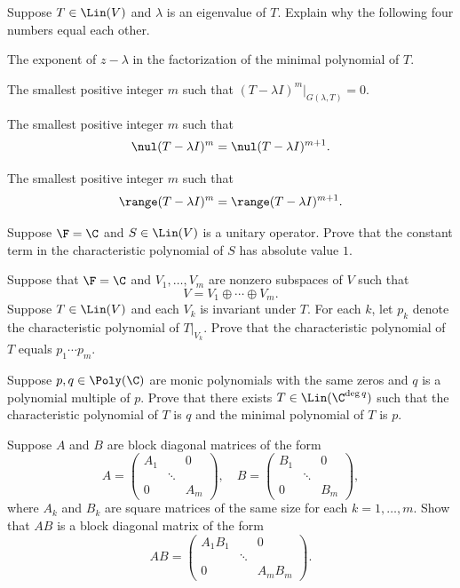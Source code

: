 \begin{exc}
\begin{exercise}
Suppose $T\in\Lin(V)$ and $\lambda$ is an eigenvalue of $T$. Explain why the
following four numbers equal each other.
\begin{parts}
\item The exponent of $z-\lambda$ in the factorization of the minimal
  polynomial of $T$.
\item The smallest positive integer $m$ such that
  $(T-\lambda I)^m|_{G(\lambda,T)}=0$.
\item The smallest positive integer $m$ such that
  \[ \nul(T-\lambda I)^m = \nul(T-\lambda I)^{m+1}. \]
\item The smallest positive integer $m$ such that
  \[ \range(T-\lambda I)^m = \range(T-\lambda I)^{m+1}. \]
\end{parts}
\end{exercise}

\begin{exercise}
Suppose $\F=\C$ and $S\in\Lin(V)$ is a unitary operator. Prove that the
constant term in the characteristic polynomial of $S$ has absolute value $1$.
\end{exercise}

\begin{exercise}
Suppose that $\F=\C$ and $V_1,\dots,V_m$ are nonzero subspaces of $V$ such
that
\[ V = V_1\oplus\cdots\oplus V_m. \]
Suppose $T\in\Lin(V)$ and each $V_k$ is invariant under $T$. For each $k$, let
$p_k$ denote the characteristic polynomial of $T|_{V_k}$. Prove that the
characteristic polynomial of $T$ equals $p_1\cdots p_m$.
\end{exercise}

\begin{exercise}
Suppose $p,q\in\Poly(\C)$ are monic polynomials with the same zeros and $q$ is
a polynomial multiple of $p$. Prove that there exists
$T\in\Lin(\C^{\deg q})$ such that the characteristic polynomial of $T$ is $q$
and the minimal polynomial of $T$ is $p$.
\end{exercise}

\begin{exercise}
Suppose $A$ and $B$ are block diagonal matrices of the form
\[ A = \begin{pmatrix} A_1 & & 0\\ & \ddots & \\ 0 & & A_m \end{pmatrix},
   \quad
   B = \begin{pmatrix} B_1 & & 0\\ & \ddots & \\ 0 & & B_m \end{pmatrix}, \]
where $A_k$ and $B_k$ are square matrices of the same size for each
$k=1,\dots,m$. Show that $AB$ is a block diagonal matrix of the form
\[ AB = \begin{pmatrix} A_1B_1 & & 0\\ & \ddots & \\ 0 & & A_mB_m
   \end{pmatrix}. \]
\end{exercise}


\end{exc}
